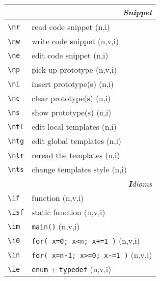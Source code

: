 \documentclass[oneside,11pt,landscape,DIV16]{scrartcl}
\begin{document}
\begin{multicols}{3}
\begin{center}
%
\begin{tabular}[]{|p{11mm}|p{60mm}|}
\hline 
\multicolumn{2}{|r|}{\textsl{S\textbf{n}ippet}} \\
\hline \verb'\nr'  & read code snippet         \hfill (n,i)\\
\hline \verb'\nw'  & write code snippet        \hfill (n,v,i)\\
\hline \verb'\ne'  & edit code snippet         \hfill (n,i)\\
\hline \verb'\np'  & pick up prototype         \hfill (n,v,i)\\
\hline \verb'\ni'  & insert prototype(s)       \hfill (n,i)\\
\hline \verb'\nc'  & clear  prototype(s)       \hfill (n,i)\\
\hline \verb'\ns'  & show   prototype(s)       \hfill (n,i)\\
%
\hline \verb'\ntl' & edit local templates      \hfill (n,i)\\
\hline \verb'\ntg' & edit global templates     \hfill (n,i)\\
\hline \verb'\ntr' & reread the templates      \hfill (n,i)\\
\hline \verb'\nts' & change templates style    \hfill (n,i)\\
\hline
\hline 
\multicolumn{2}{|r|}{\textsl{\textbf{I}dioms}}   \\
\hline \verb'\if'  & function                         \hfill (n,v,i)\\
\hline \verb'\isf' & static function                  \hfill (n,v,i)\\
\hline \verb'\im'  & \verb'main()'                    \hfill (n,v,i)\\
\hline \verb'\i0'  & \verb'for( x=0; x<n; x+=1 )'     \hfill (n,v,i)\\
\hline \verb'\in'  & \verb'for( x=n-1; x>=0; x-=1 )'  \hfill (n,v,i)\\
\hline \verb'\ie'  & \verb'enum'   + \verb'typedef'   \hfill (n,v,i)\\

\end{tabular}
\end{center}
\end{multicols}
\end{document}
